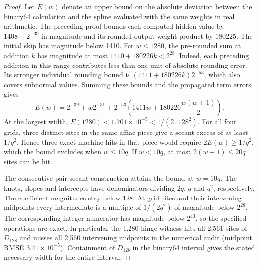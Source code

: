 \begin{proof}
Let \(E(w)\) denote an upper bound on the absolute deviation between the binary64 calculation and the spline evaluated with the same weights in real arithmetic. The preceding proof bounds each computed hidden value by
\(1408+2^{-39}\) in magnitude and its rounded output-weight product by
\(180225\). The initial skip has magnitude below 1410. For \(w\le1280\),
the pre-rounded sum at addition \(k\) has magnitude at most
\(1410+180226k<2^{28}\). Indeed, each preceding addition in this range
contributes less than one unit of absolute rounding error. Its stronger
individual rounding bound is \((1411+180226k)2^{-53}\), which also covers
subnormal values. Summing these bounds and the propagated term errors gives
\[
 E(w)=2^{-39}+w2^{-31}
       +2^{-53}\left(1411w+180226\frac{w(w+1)}{2}\right).
\]
At the largest width, \(E(1280)<1.701\times10^{-5}<
1/(2\cdot128^2)\). For all four grids, three distinct sites in the same
affine piece give a secant excess of at least \(1/q^2\). Hence three exact
machine hits in that piece would require \(2E(w)\ge1/q^2\), which the bound
excludes when \(w\le10q\). If \(w<10q\), at most \(2(w+1)\le20q\) sites
can be hit.

The consecutive-pair secant construction attains the bound at \(w=10q\).
The knots, slopes and intercepts have denominators dividing \(2q\), \(q\)
and \(q^2\), respectively. The coefficient magnitudes stay below 128.
At grid sites and their intervening midpoints every intermediate is a
multiple of \(1/(2q^2)\) of magnitude below \(2^{28}\). The corresponding
integer numerator has magnitude below \(2^{43}\), so the specified
operations are exact. In particular the 1,280-hinge witness hits all
2,561 sites of \(D_{128}\) and misses all 2,560 intervening midpoints
in the numerical audit (midpoint RMSE \(3.41\times10^{-5}\)). Containment of \(D_{128}\) in the binary64
interval gives the stated necessary width for the entire interval.
\end{proof}
